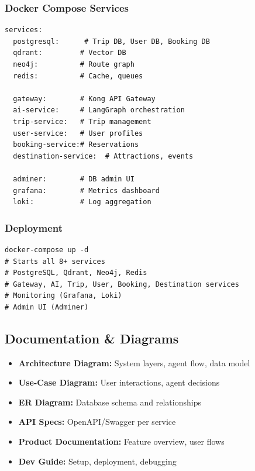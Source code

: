 \documentclass[11pt]{article}
\begin{document}
\subsubsection{Docker Compose Services}

\begin{lstlisting}[caption=Core Services in docker-compose.yml]
services:
  postgresql:      # Trip DB, User DB, Booking DB
  qdrant:         # Vector DB
  neo4j:          # Route graph
  redis:          # Cache, queues
  
  gateway:        # Kong API Gateway
  ai-service:     # LangGraph orchestration
  trip-service:   # Trip management
  user-service:   # User profiles
  booking-service:# Reservations
  destination-service:  # Attractions, events
  
  adminer:        # DB admin UI
  grafana:        # Metrics dashboard
  loki:           # Log aggregation
\end{lstlisting}

\subsubsection{Deployment}

\begin{lstlisting}[caption=One-command Deployment]
docker-compose up -d
# Starts all 8+ services
# PostgreSQL, Qdrant, Neo4j, Redis
# Gateway, AI, Trip, User, Booking, Destination services
# Monitoring (Grafana, Loki)
# Admin UI (Adminer)
\end{lstlisting}

\subsection{Documentation \& Diagrams}

\begin{itemize}
    \item \textbf{Architecture Diagram:} System layers, agent flow, data model
    \item \textbf{Use-Case Diagram:} User interactions, agent decisions
    \item \textbf{ER Diagram:} Database schema and relationships
    \item \textbf{API Specs:} OpenAPI/Swagger per service
    \item \textbf{Product Documentation:} Feature overview, user flows
    \item \textbf{Dev Guide:} Setup, deployment, debugging
\end{itemize}
\end{document}
